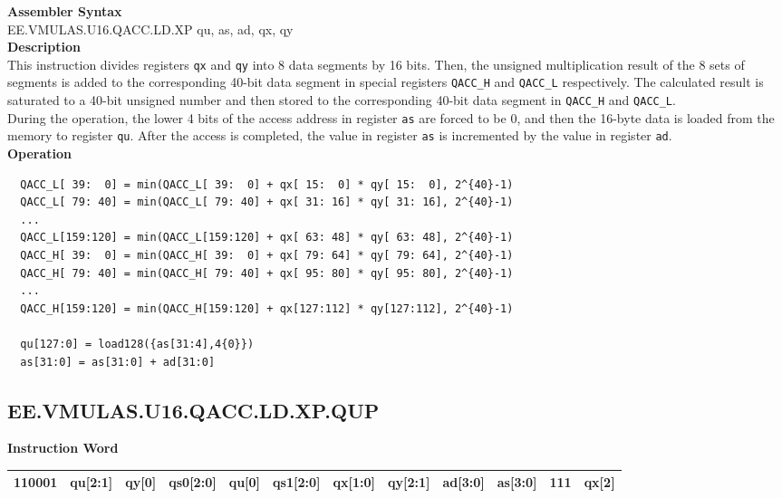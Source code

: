 \textbf{Assembler Syntax} \\
EE.VMULAS.U16.QACC.LD.XP qu, as, ad, qx, qy \\
\textbf{Description} \\
This instruction divides registers \lstinline{qx} and \lstinline{qy} into 8 data segments by 16 bits. Then, the unsigned multiplication result of the 8 sets of segments is added to the corresponding 40-bit data segment in special registers \lstinline{QACC_H} and \lstinline{QACC_L} respectively. The calculated result is saturated to a 40-bit unsigned number and then stored to the corresponding 40-bit data segment in \lstinline{QACC_H} and \lstinline{QACC_L}.\\
During the operation, the lower 4 bits of the access address in register \lstinline{as} are forced to be 0, and then the 16-byte data is loaded from the memory to register \lstinline{qu}. After the access is completed, the value in register \lstinline{as} is incremented by the value in register \lstinline{ad}.\\
\textbf{Operation}
\begin{lstlisting}
  QACC_L[ 39:  0] = min(QACC_L[ 39:  0] + qx[ 15:  0] * qy[ 15:  0], 2^{40}-1)
  QACC_L[ 79: 40] = min(QACC_L[ 79: 40] + qx[ 31: 16] * qy[ 31: 16], 2^{40}-1)
  ...
  QACC_L[159:120] = min(QACC_L[159:120] + qx[ 63: 48] * qy[ 63: 48], 2^{40}-1)
  QACC_H[ 39:  0] = min(QACC_H[ 39:  0] + qx[ 79: 64] * qy[ 79: 64], 2^{40}-1)
  QACC_H[ 79: 40] = min(QACC_H[ 79: 40] + qx[ 95: 80] * qy[ 95: 80], 2^{40}-1)
  ...
  QACC_H[159:120] = min(QACC_H[159:120] + qx[127:112] * qy[127:112], 2^{40}-1)

  qu[127:0] = load128({as[31:4],4{0}})
  as[31:0] = as[31:0] + ad[31:0]
\end{lstlisting}

\clearpage
\subsection{EE.VMULAS.U16.QACC.LD.XP.QUP}\label{instruction:EEVMULASU16QACCLDXPQUP}
\setlength\tabcolsep{6pt}
\textbf{Instruction Word} \\
\begin{tabular}{|c|c|c|c|c|c|c|c|c|c|c|c|}
	\hline
	110001 & qu[2:1] & qy[0] & qs0[2:0] & qu[0] & qs1[2:0] & qx[1:0] & qy[2:1] & ad[3:0] & as[3:0] & 111 & qx[2] \\
	\hline
\end{tabular}

